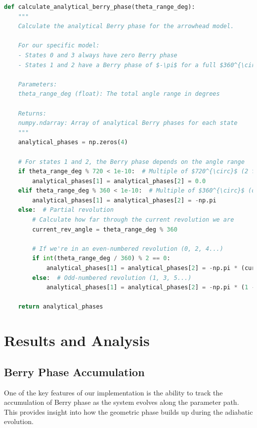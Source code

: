 \documentclass[12pt,a4paper]{article}
\begin{document}
\begin{lstlisting}[language=Python, caption=Analytical Berry Phase Calculation]
def calculate_analytical_berry_phase(theta_range_deg):
    """
    Calculate the analytical Berry phase for the arrowhead model.
    
    For our specific model:
    - States 0 and 3 always have zero Berry phase
    - States 1 and 2 have a Berry phase of $-\pi$ for a full $360^{\circ}$ revolution
    
    Parameters:
    theta_range_deg (float): The total angle range in degrees
    
    Returns:
    numpy.ndarray: Array of analytical Berry phases for each state
    """
    analytical_phases = np.zeros(4)
    
    # For states 1 and 2, the Berry phase depends on the angle range
    if theta_range_deg % 720 < 1e-10:  # Multiple of $720^{\circ}$ (2 full revolutions)
        analytical_phases[1] = analytical_phases[2] = 0.0
    elif theta_range_deg % 360 < 1e-10:  # Multiple of $360^{\circ}$ (odd number of revolutions)
        analytical_phases[1] = analytical_phases[2] = -np.pi
    else:  # Partial revolution
        # Calculate how far through the current revolution we are
        current_rev_angle = theta_range_deg % 360
        
        # If we're in an even-numbered revolution (0, 2, 4...)
        if int(theta_range_deg / 360) % 2 == 0:
            analytical_phases[1] = analytical_phases[2] = -np.pi * (current_rev_angle / 360)
        else:  # Odd-numbered revolution (1, 3, 5...)
            analytical_phases[1] = analytical_phases[2] = -np.pi * (1 - current_rev_angle / 360)
    
    return analytical_phases
\end{lstlisting}

\section{Results and Analysis}

\subsection{Berry Phase Accumulation}

One of the key features of our implementation is the ability to track the accumulation of Berry phase as the system evolves along the parameter path. This provides insight into how the geometric phase builds up during the adiabatic evolution.
\end{document}
